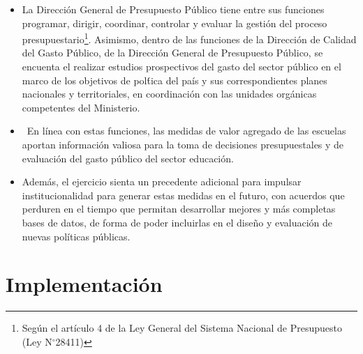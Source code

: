 \documentclass[11pt]{article}
\numberwithin{equation}{section}
\begin{document}
\begin{itemize}


\item {\bf} La Direcci\'on General de Presupuesto P\'ublico tiene entre sus funciones programar, dirigir, coordinar, controlar y evaluar la gesti\'on del proceso presupuestario\footnote{Seg\'un el art\'iculo 4 de la Ley General del Sistema Nacional de Presupuesto (Ley N$^\circ$28411)}. Asimismo, dentro de las funciones de la Direcci\'on de Calidad del Gasto P\'ublico, de la Direcci\'on General de Presupuesto P\'ublico, se encuenta el realizar estudios prospectivos del gasto del sector p\'ublico en el marco de los objetivos de pol\'tica del pa\'is y sus correspondientes planes nacionales y territoriales, en coordinaci\'on con las unidades org\'anicas competentes del Ministerio.
\item\ En l\'inea con estas funciones, las medidas de valor agregado de las escuelas aportan informaci\'on valiosa para la toma de decisiones presupuestales y de evaluaci\'on del gasto p\'ublico del sector educaci\'on. 
\item Adem\'as, el ejercicio sienta un precedente adicional para impulsar institucionalidad para generar estas medidas en el futuro, con acuerdos que perduren en el tiempo que permitan desarrollar mejores y m\'as completas bases de datos, de forma de poder incluirlas en el dise\~no y evaluaci\'on de nuevas pol\'iticas p\'ublicas.



\end{itemize}

\section{Implementaci\'on}
\end{document}
